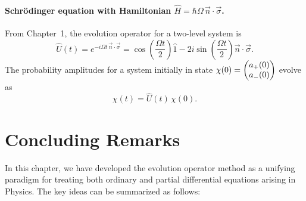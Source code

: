 \paragraph{Schr\"odinger equation with Hamiltonian $\hat{H}=\hbar\Omega\,\vec{n}\cdot\vec{\sigma}$.}
From Chapter~1, the evolution operator for a two-level system is
\begin{equation}
\hat{U}(t)=e^{-i\Omega t\,\vec{n}\cdot\vec{\sigma}}
=\cos\!\left(\frac{\Omega t}{2}\right)\hat{1}
-2i\sin\!\left(\frac{\Omega t}{2}\right)\vec{n}\cdot\vec{\sigma}.
\label{eq:2.6.7}
\end{equation}
The probability amplitudes for a system initially in state $\chi(0)=\begin{pmatrix}a_{+}(0)\\a_{-}(0)\end{pmatrix}$ evolve as
\begin{equation}
\chi(t)=\hat{U}(t)\,\chi(0).
\label{eq:2.6.8}
\end{equation}

\section{Concluding Remarks}

In this chapter, we have developed the evolution operator method as a unifying paradigm for treating both ordinary and partial differential equations arising in Physics. The key ideas can be summarized as follows:

